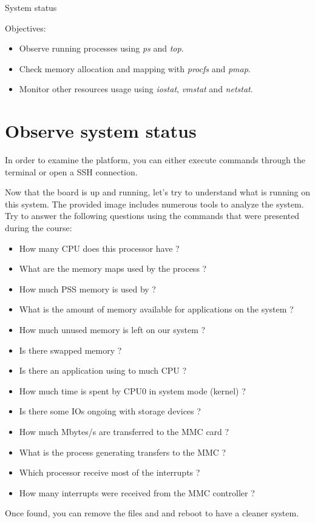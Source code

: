 \subchapter
{System status}
{Objectives:
  \begin{itemize}
    \item Observe running processes using {\em ps} and {\em top}.
    \item Check memory allocation and mapping with {\em procfs} and {\em pmap}.
    \item Monitor other resources usage using {\em iostat}, {\em vmstat} and {\em netstat}.
  \end{itemize}
}

\section{Observe system status}

In order to examine the platform, you can either execute commands through the
 terminal or open a SSH connection.

Now that the board is up and running, let's try to understand what is running
on this system. The provided image includes numerous tools to analyze the
system. Try to answer the following questions using the commands that were
presented during the course:

\begin{itemize}
  \item How many CPU does this processor have ?
  \item What are the memory maps used by the  process ?
  \item How much PSS memory is used by  ?
  \item What is the amount of memory available for applications on the system ?
  \item How much unused memory is left on our system ?
  \item Is there swapped memory ?
  \item Is there an application using to much CPU ?
  \item How much time is spent by CPU0 in system mode (kernel) ?
  \item Is there some IOs ongoing with storage devices ?
  \item How much Mbytes/s are transferred to the MMC card ?
  \item What is the process generating transfers to the MMC ?
  \item Which processor receive most of the interrupts ?
  \item How many interrupts were received from the MMC controller ?
\end{itemize}

Once found, you can remove the files  and
 and reboot to have a cleaner system.
